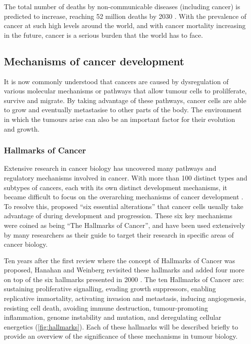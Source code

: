The total number of deaths by non-communicable diseases (including cancer) is predicted to increase, reaching 52 million deaths by 2030 \citep{WHO2014}.
With the prevalence of cancer at such high levels around the world, and with cancer mortality increasing in the future, cancer is a serious burden that the world has to face.

\subsection{Mechanisms of cancer development}
\label{sub:mechanisms_of_cancer_development}

It is now commonly understood that cancers are caused by dysregulation of various molecular mechanisms or pathways that allow tumour cells to prolilferate, survive and migrate.
By taking advantage of these pathways, cancer cells are able to grow and eventually metastasise to other parts of the body.
The environment in which the tumours arise can also be an important factor for their evolution and growth.

\subsubsection{Hallmarks of Cancer}
\label{subsubsec:cancerhallmarks}

Extensive research in cancer biology has uncovered many pathways and regulatory mechanisms involved in cancer.
With more than 100 distinct types and subtypes of cancers, each with its own distinct development mechanisms, it became difficult to focus on the overarching mechanisms of cancer development \citep{Hanahan2000}.
To resolve this, \citet{Hanahan2000} proposed ``six essential alterations'' that cancer cells usually take advantage of during development and progression.
These six key mechanisms were coined as being ``The Hallmarks of Cancer'', and have been used extensively by many researchers as their guide to target their research in specific areas of cancer biology.

Ten years after the first review where the concept of Hallmarks of Cancer was proposed, Hanahan and Weinberg revisited these hallmarks and added four more on top of the six hallmarks presented in 2000 \citep{Hanahan2011}.
The ten Hallmarks of Cancer are: sustaining proliferative signalling, evading growth suppressors, enabling replicative immortality, activating invasion and metastasis, inducing angiogenesis, resisting cell death, avoiding immune destruction, tumour-promoting inflammation, genome instability and mutation, and deregulating cellular energetics (\cref{fig:hallmarks}).
Each of these hallmarks will be described briefly to provide an overview of the significance of these mechanisms in tumour biology.

